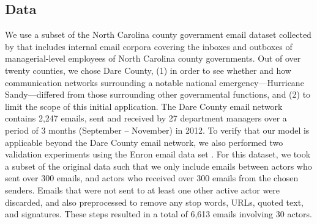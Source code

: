 \documentclass{article}
\begin{document}
\subsection{Data}\label{subsec:Data}
We use a subset of the North Carolina county government email dataset collected by \cite{ben2017transparency} that includes internal email corpora covering the inboxes and outboxes of managerial-level employees of North Carolina county governments. Out of over twenty counties, we chose Dare County, (1) in order to see whether and how communication networks surrounding a notable national emergency---Hurricane Sandy---differed from those surrounding other governmental functions, and (2) to limit the scope of this initial application. The Dare County email network contains 2,247 emails, sent and received by 27 department managers over a period of 3 months (September -- November) in 2012. To verify that our model is applicable beyond the Dare County email network, we also performed two validation experiments using the Enron email data set \cite{klimt2004introducing}. For this dataset, we took a subset of the original data such that we only include emails between actors who sent over 300 emails, and actors who received over 300 emails from the chosen senders. Emails that were not sent to at least one other active actor were discarded, and also preprocessed to remove any stop words, URLs, quoted text, and signatures. These steps resulted in a total of 6,613 emails involving 30 actors. 
\end{document}
